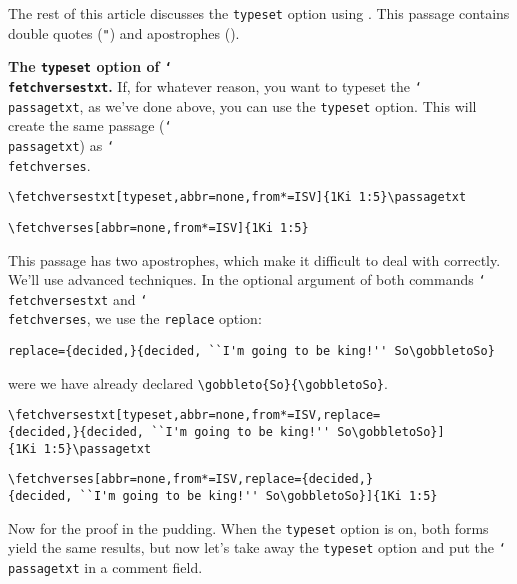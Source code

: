 \documentclass{article}
\def\cs#1{\texttt{\char`\\#1}}
\begin{document}
The rest of this article discusses the \texttt{typeset} option using
\versetxt.\pdfmargincomment[author={\versetxt}]{\passagetxt}
This passage contains double quotes (\texttt{"}) and apostrophes (\texttt{}).

\medskip\noindent
\textbf{The \texttt{typeset} option of \cs{fetchversestxt}.} If, for whatever reason, you want
to typeset the \cs{passagetxt}, as we've done above, you can use the
\texttt{typeset} option. This will create the same passage (\cs{passagetxt})
as \cs{fetchverses}.

\medskip\goodbreak\noindent
\verb~\fetchversestxt[typeset,abbr=none,from*=ISV]{1Ki 1:5}\passagetxt~\\[3pt]
\bDQ\eSQ{}\passagetxt

\medskip\noindent
\verb~\fetchverses[abbr=none,from*=ISV]{1Ki 1:5}~\\[3pt]
\bDQ\eSQ{}

\medskip
This passage has two apostrophes, which make it difficult to deal with
correctly. We'll use advanced techniques. In the optional argument of both
commands \cs{fetchversestxt} and \cs{fetchverses}, we use the
\texttt{replace} option:
\begin{flushleft}\small
\quad\verb~replace={decided,}{decided, ``I'm going to be king!'' So\gobbletoSo}~
\end{flushleft} were we have already declared
\verb~\gobbleto{So}{\gobbletoSo}~.

\medskip\noindent
{}
\verb~\fetchversestxt[typeset,abbr=none,from*=ISV,replace=~\\
\verb~{decided,}{decided, ``I'm going to be king!'' So\gobbletoSo}]~\\
\verb~{1Ki 1:5}\passagetxt~\\[3pt]
\bDQ\eSQ{}\passagetxt

\medskip\noindent
\verb~\fetchverses[abbr=none,from*=ISV,replace={decided,}~\\
\verb~{decided, ``I'm going to be king!'' So\gobbletoSo}]{1Ki 1:5}~\\[3pt]
\bDQ\eSQ{}

\medskip
Now for the proof in the pudding. When the \texttt{typeset} option is on,
both forms yield the same results, but now let's take away the
\texttt{typeset} option and put the \cs{passagetxt} in a comment
field.
\pdfmargincomment[author={\versetxt}]{\passagetxt}
\end{document}
